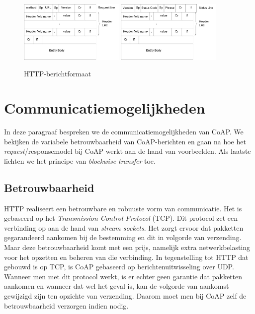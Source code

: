 \begin{figure}[h]
\vspace{10pt}
\centering
{}
{\includegraphics[width=0.45\textwidth]{fig/HTTPRequestMessageFormat}}
{\includegraphics[width=0.45\textwidth]{fig/HTTPResponseMessageFormat}}
\caption{HTTP-berichtformaat}
\label{fig:HTTPMessageFormat}
\end{figure}

\newpage

\section{Communicatiemogelijkheden} \label{communicatieMogelijkheden}

In deze paragraaf bespreken we de communicatiemogelijkheden van CoAP. We bekijken de variabele betrouwbaarheid van CoAP-berichten en gaan na hoe het \textit{request}/responsemodel bij CoAP werkt aan de hand van voorbeelden. Als laatste lichten we het principe van \textit{blockwise transfer} toe.

\subsection{Betrouwbaarheid} \label{betrouwbaarheid}

HTTP realiseert een betrouwbare en robuuste vorm van communicatie. Het is gebaseerd op het \textit{Transmission Control Protocol} (TCP). Dit protocol zet een verbinding op aan de hand van \textit{stream sockets}. Het zorgt ervoor dat pakketten gegarandeerd aankomen bij de bestemming en dit in volgorde van verzending. Maar deze betrouwbaarheid komt met een prijs, namelijk extra netwerkbelasting voor het opzetten en beheren van die verbinding. In tegenstelling tot HTTP dat gebouwd is op TCP, is CoAP gebaseerd op berichtenuitwisseling over UDP. Wanneer men met dit protocol werkt, is er echter geen garantie dat pakketten aankomen en wanneer dat wel het geval is, kan de volgorde van aankomst gewijzigd zijn ten opzichte van verzending. Daarom moet men bij CoAP zelf de betrouwbaarheid verzorgen indien nodig.


